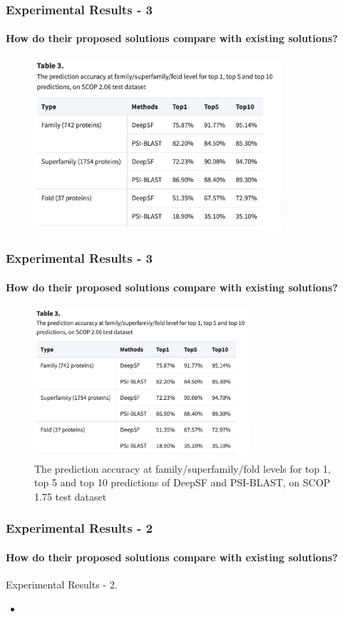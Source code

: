 \documentclass[xcolor={usenames,dvipsnames},hyperref={hyperindex,bookmarks}]{beamer}
\begin{document}
\frame
{
	\frametitle{Experimental Results - 3}
	\framesubtitle{How do their proposed solutions compare with existing solutions?}


	\begin{figure}[h]
	\centering 
	\includegraphics[height=2.5in]{./pics/table-3}
	\label{fig:Table2}
	\end{figure}
}








\frame
{
	\frametitle{Experimental Results - 3}
	\framesubtitle{How do their proposed solutions compare with existing solutions?}


	\begin{figure}[h]
	\centering 
	\includegraphics[height=2.2in]{./pics/table-3}
	\caption{The prediction accuracy at family/superfamily/fold levels for top 1, top 5 and top 10 predictions of DeepSF and PSI-BLAST, on SCOP 1.75 test dataset}
	\label{fig:Table2}
	\end{figure}
}




\frame
{
	\frametitle{Experimental Results - 2}
	\framesubtitle{How do their proposed solutions compare with existing solutions?}

	Experimental Results - 2.
	\begin{itemize}
	\item 
	\end{itemize}

}
\end{document}
